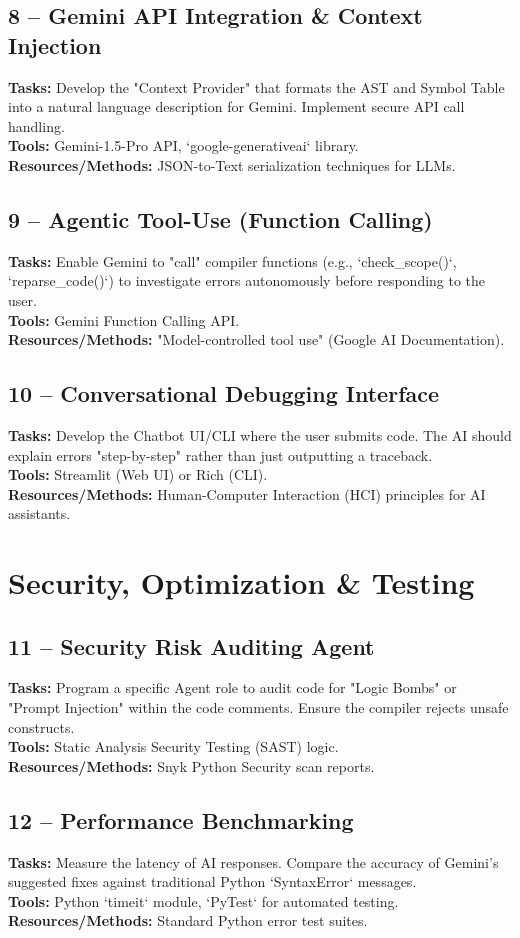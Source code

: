 \documentclass[a4paper,11pt]{article}
\newcommand{\weekdetail}[3]{
    \textbf{Tasks:} #1 \\
    \textbf{Tools:} #2 \\
    \textbf{Resources/Methods:} #3 \\
}
\begin{document}
\subsection{8 -- Gemini API Integration \& Context Injection}
\weekdetail{
    Develop the "Context Provider" that formats the AST and Symbol Table into a natural language description for Gemini. Implement secure API call handling.
}{
    Gemini-1.5-Pro API, `google-generativeai` library.
}{
    JSON-to-Text serialization techniques for LLMs.
}

\subsection{9 -- Agentic Tool-Use (Function Calling)}
\weekdetail{
    Enable Gemini to "call" compiler functions (e.g., `check_scope()`, `reparse_code()`) to investigate errors autonomously before responding to the user.
}{
    Gemini Function Calling API.
}{
    "Model-controlled tool use" (Google AI Documentation).
}

\subsection{10 -- Conversational Debugging Interface}
\weekdetail{
    Develop the Chatbot UI/CLI where the user submits code. The AI should explain errors "step-by-step" rather than just outputting a traceback.
}{
    Streamlit (Web UI) or Rich (CLI).
}{
    Human-Computer Interaction (HCI) principles for AI assistants.
}

\section{Security, Optimization \& Testing}

\subsection{11 -- Security Risk Auditing Agent}
\weekdetail{
    Program a specific Agent role to audit code for "Logic Bombs" or "Prompt Injection" within the code comments. Ensure the compiler rejects unsafe constructs.
}{
    Static Analysis Security Testing (SAST) logic.
}{
    Snyk Python Security scan reports.
}

\subsection{12 -- Performance Benchmarking}
\weekdetail{
    Measure the latency of AI responses. Compare the accuracy of Gemini's suggested fixes against traditional Python `SyntaxError` messages.
}{
    Python `timeit` module, `PyTest` for automated testing.
}{
    Standard Python error test suites.
}
\end{document}
